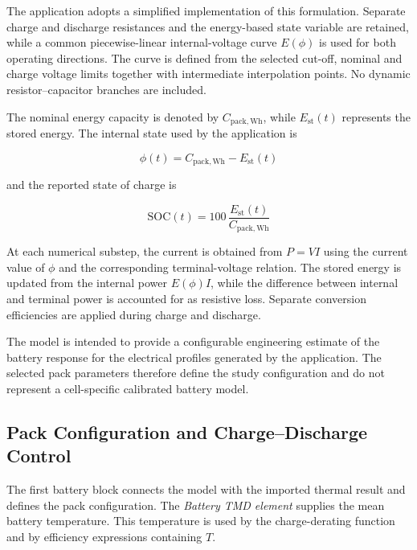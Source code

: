 The application adopts a simplified implementation of this formulation.
Separate charge and discharge resistances and the energy-based state variable
are retained, while a common piecewise-linear internal-voltage curve
$E(\phi)$ is used for both operating directions. The curve is defined from
the selected cut-off, nominal and charge voltage limits together with
intermediate interpolation points. No dynamic resistor--capacitor branches
are included.

The nominal energy capacity is denoted by \(C_{\mathrm{pack,Wh}}\), while
\(E_{\mathrm{st}}(t)\) represents the stored energy. The internal state used
by the application is

\begin{equation}
    \phi(t)
    =
    C_{\mathrm{pack,Wh}}-E_{\mathrm{st}}(t)
    \label{eq:battery_phi_implemented_ch8}
\end{equation}

and the reported state of charge is

\begin{equation}
    \mathrm{SOC}(t)
    =
    100\,
    \frac{E_{\mathrm{st}}(t)}
         {C_{\mathrm{pack,Wh}}}
    \label{eq:battery_soc_ch8}
\end{equation}

At each numerical substep, the current is obtained from $P=VI$ using the
current value of $\phi$ and the corresponding terminal-voltage relation.
The stored energy is updated from the internal power $E(\phi)I$, while the
difference between internal and terminal power is accounted for as resistive
loss. Separate conversion efficiencies are applied during charge and
discharge.

The model is intended to provide a configurable engineering estimate of the
battery response for the electrical profiles generated by the application.
The selected pack parameters therefore define the study configuration and do
not represent a cell-specific calibrated battery model.

\subsection{Pack Configuration and Charge--Discharge Control}
\label{subsec:battery_configuration_control}

The first battery block connects the model with the imported thermal result
and defines the pack configuration. The \emph{Battery TMD element} supplies
the mean battery temperature. This temperature is used by the charge-derating
function and by efficiency expressions containing $T$.

